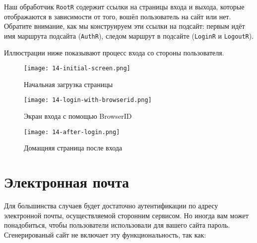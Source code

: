 Наш обработчик \lstinline'RootR' содержит ссылки на страницы входа и выхода, которые отображаются в зависимости от того, вошёл пользователь на сайт или нет. Обратите внимание, как мы конструируем эти ссылки на подсайт: первым идёт имя маршрута подсайта (\lstinline'AuthR'), следом маршрут в подсайте (\lstinline'LoginR' и \lstinline'LogoutR').

Иллюстрации ниже показывают процесс входа со стороны пользователя.

\begin{figure}[h!]
  \centering
  \texttt{[image: 14-initial-screen.png]}
  \caption{Начальная загрузка страницы}
\end{figure}

\begin{figure}[h!]
  \centering
  \texttt{[image: 14-login-with-browserid.png]}
  \caption{Экран входа с помощью BrowserID}
\end{figure}

\begin{figure}[h!]
  \centering
  \texttt{[image: 14-after-login.png]}
  \caption{Домащняя страница после входа}
\end{figure}

\section{Электронная почта}

Для большинства случаев будет достаточно аутентификации по адресу электронной почты, осуществляемой сторонним сервисом. Но иногда вам может понадобиться, чтобы пользователи использовали для вашего сайта пароль. Сгенерированый сайт не включает эту функциональность, так как:

